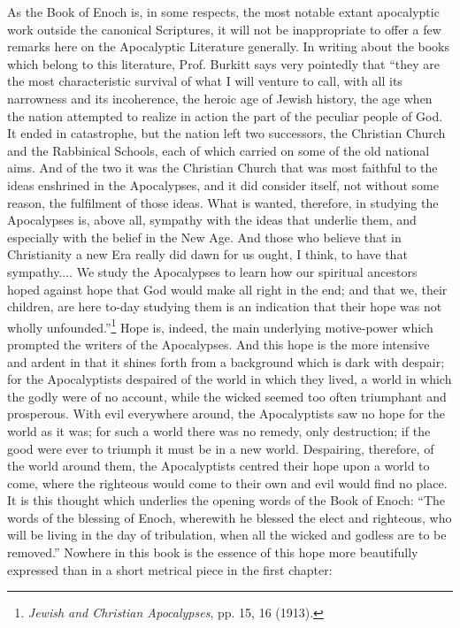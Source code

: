 As the Book of Enoch is, in some respects, the most
notable extant apocalyptic work outside the canonical
Scriptures, it will not be inappropriate to offer a few
remarks here on the Apocalyptic Literature generally.
In writing about the books which belong to this
literature, Prof. Burkitt says very pointedly that
“they are the most characteristic survival of what
I will venture to call, with all its narrowness and its
incoherence, the heroic age of Jewish history, the age
when the nation attempted to realize in action the
part of the peculiar people of God. It ended in
catastrophe, but the nation left two successors, the
Christian Church and the Rabbinical Schools, each
of which carried on some of the old national aims.
And of the two it was the Christian Church that
was most faithful to the ideas enshrined in the
Apocalypses, and it did consider itself, not without
some reason, the fulfilment of those ideas. What is
wanted, therefore, in studying the Apocalypses is,
above all, sympathy with the ideas that underlie
them, and especially with the belief in the New Age.
And those who believe that in Christianity a new Era
really did dawn for us ought, I think, to have that
sympathy.... We study the Apocalypses to learn
how our spiritual ancestors hoped against hope that
God would make all right in the end; and that we,
their children, are here to-day studying them is an indication
that their hope was not wholly unfounded.”\footnote{\emph{Jewish and Christian Apocalypses}, pp. 15, 16 (1913).}
Hope is, indeed, the main underlying motive-power
which prompted the writers of the Apocalypses.
And this hope is the more intensive and ardent in
that it shines forth from a background which is dark
with despair; for the Apocalyptists despaired of the
world in which they lived, a world in which the godly
were of no account, while the wicked seemed too often
triumphant and prosperous. With evil everywhere
around, the Apocalyptists saw no hope for the world
as it was; for such a world there was no remedy,
only destruction; if the good were ever to triumph
it must be in a new world. Despairing, therefore,
of the world around them, the Apocalyptists centred
their hope upon a world to come, where the righteous
would come to their own and evil would find no
place. It is this thought which underlies the opening
words of the Book of Enoch: “The words of the
blessing of Enoch, wherewith he blessed the elect
and righteous, who will be living in the day of tribulation,
when all the wicked and godless are to be
removed.” Nowhere in this book is the essence of
this hope more beautifully expressed than in a short
metrical piece in the first chapter:

